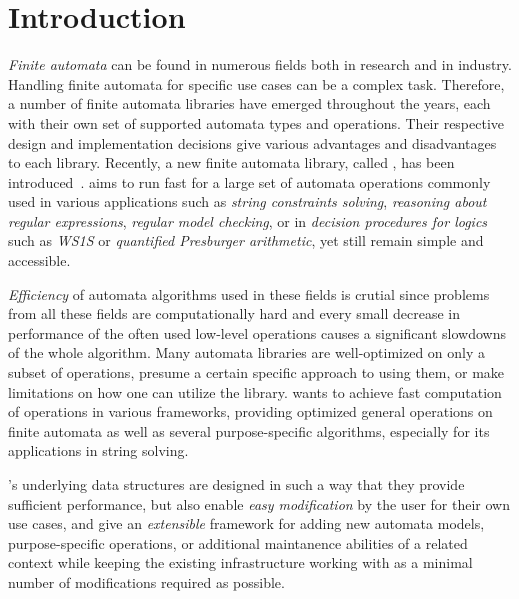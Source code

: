 
% 

\chapter{Introduction}

\emph{Finite automata} can be found in numerous fields both in research and in industry.
Handling finite automata for specific use cases can be a complex task.
Therefore, a number of finite automata libraries have emerged throughout the years, each with their own set of supported automata types and operations.
Their respective design and implementation decisions give various advantages and disadvantages to each library.
Recently, a new finite automata library, called \mata, has been introduced~\cite{tacas24_mata_10.1007/978-3-031-57249-4_7}.
\mata aims to run fast for a large set of automata operations commonly used in various applications such as \emph{string constraints solving}, \emph{reasoning about regular expressions}, \emph{regular model checking}, or in \emph{decision procedures for logics} such as \emph{WS1S} or \emph{quantified Presburger arithmetic}, yet still remain simple and accessible.

\emph{Efficiency} of automata algorithms used in these fields is crutial since problems from all these fields are computationally hard and every small decrease in performance of the often used low-level operations causes a significant slowdowns of the whole algorithm.
Many automata libraries are well-optimized on only a subset of operations, presume a certain specific approach to using them, or make limitations on how one can utilize the library.
\mata wants to achieve fast computation of operations in various frameworks, providing optimized general operations on finite automata as well as several purpose-specific algorithms, especially for its applications in string solving.

\mata's underlying data structures are designed in such a way that they provide sufficient performance, but also enable \emph{easy modification} by the user for their own use cases, and give an \emph{extensible} framework for adding new automata models, purpose-specific operations, or additional maintanence abilities of a related context while keeping the existing infrastructure working with as a minimal number of modifications required as possible.

